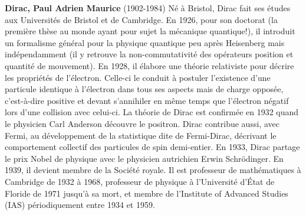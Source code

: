 \textbf{Dirac, Paul Adrien Maurice} (1902-1984) Né à Bristol, Dirac fait ses études aux Universités de Bristol et de Cambridge. En 1926, pour son doctorat (la première thèse au monde ayant pour sujet la mécanique quantique!), il introduit un formalisme général pour la physique quantique peu après Heisenberg mais indépendamment (il y retrouve la non-commutativité des opérateurs position et quantité de mouvement). En 1928, il élabore une théorie relativiste pour décrire les propriétés de l'électron. Celle-ci le conduit à postuler l'existence d'une particule identique à l'électron dans tous ses aspects mais de charge opposée, c'est-à-dire positive et devant s'annihiler en même temps que l'électron négatif lors d'une collision avec celui-ci. La théorie de Dirac est confirmée en 1932 quand le physicien Carl Anderson découvre le positron. Dirac contribue aussi, avec Fermi, au développement de la statistique dite de Fermi-Dirac, décrivant le comportement collectif des particules de spin demi-entier. En 1933, Dirac partage le prix Nobel de physique avec le physicien autrichien Erwin Schrödinger. En 1939, il devient membre de la Société royale. Il est professeur de mathématiques à Cambridge de 1932 à 1968, professeur de physique à l'Université d'État de Floride de 1971 jusqu'à sa mort, et membre de l'Institute of Advanced Studies (IAS) périodiquement entre 1934 et 1959.

